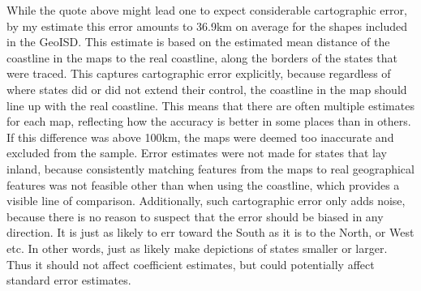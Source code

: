 \documentclass[12pt]{article}
\begin{document}
While the quote above might lead one to expect considerable cartographic error,
by my estimate this error amounts to 36.9km on average for the shapes included
in the GeoISD. This estimate is based on the estimated mean distance of the
coastline in the maps to the real coastline, along the borders of the states
that were traced. This captures cartographic error explicitly, because
regardless of where states did or did not extend their control, the coastline in
the map should line up with the real coastline. This means that there are often
multiple estimates for each map, reflecting how the accuracy is better in some
places than in others. If this difference was above 100km, the maps were deemed
too inaccurate and excluded from the sample. Error estimates were not made for
states that lay inland, because consistently matching features from the maps to
real geographical features was not feasible other than when using the coastline,
which provides a visible line of comparison. Additionally, such cartographic
error only adds noise, because there is no reason to suspect that the error
should be biased in any direction. It is just as likely to err toward the South
as it is to the North, or West etc. In other words, just as likely make
depictions of states smaller or larger. Thus it should not affect coefficient
estimates, but could potentially affect standard error estimates.
\end{document}
